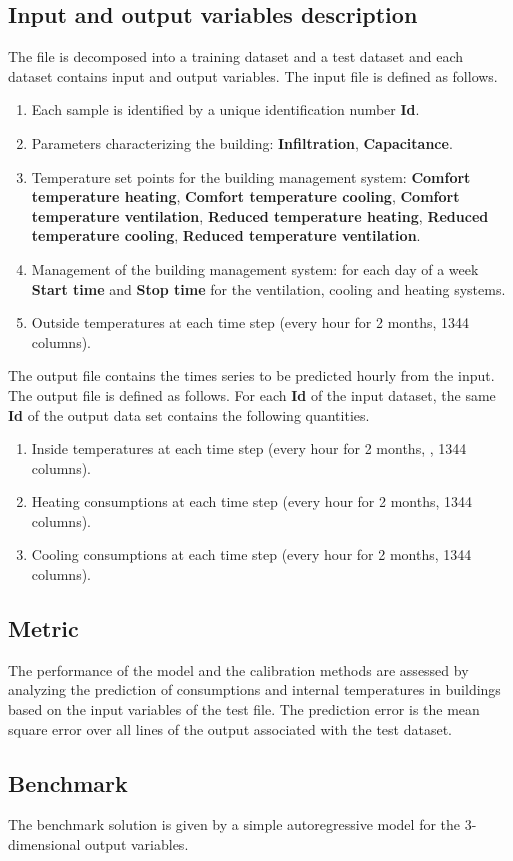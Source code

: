 \documentclass[nolayout]{article}
\begin{document}
\subsection*{Input and output variables description}
The file is decomposed into a training dataset  and a test dataset and each dataset contains input and output variables.
 The input file is defined as follows. 
\begin{enumerate}[-]
\item Each sample is identified by a unique identification number {\bf Id}.
\item Parameters characterizing the building: {\bf Infiltration}, {\bf Capacitance}.
\item Temperature set points for the building management system: {\bf Comfort temperature heating}, {\bf Comfort temperature cooling}, {\bf Comfort temperature ventilation}, {\bf Reduced temperature heating}, {\bf Reduced temperature cooling}, {\bf Reduced temperature ventilation}. 
\item Management of the building management system: for each day of a week {\bf Start time} and {\bf Stop time} for the ventilation, cooling and heating systems. 
\item Outside temperatures at each time step (every hour for 2 months, 1344 columns).
\end{enumerate}

The output file contains the times series to be predicted hourly from the input. The output file is defined as follows. For each {\bf Id} of the input dataset, the same {\bf Id} of the output data set contains the following quantities.
\begin{enumerate}[-]
\item Inside temperatures at each time step (every hour for 2 months, , 1344 columns).
\item Heating consumptions at each time step (every hour for 2 months, 1344 columns).
\item Cooling consumptions at each time step (every hour for 2 months, 1344 columns).
\end{enumerate}


\subsection*{Metric}
The performance of the model and the calibration methods are assessed by analyzing the prediction of consumptions and internal temperatures in buildings based on the input variables of the test file. The prediction error is the mean square error over all lines of the output associated with the test dataset. 

\subsection*{Benchmark}
The benchmark solution is given by a simple autoregressive model for the $3$-dimensional output variables.
\end{document}
